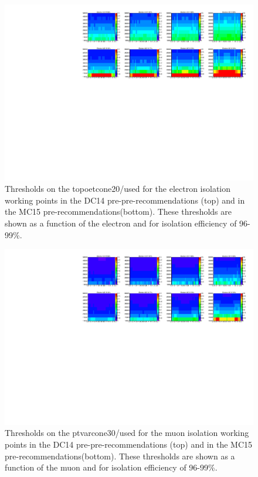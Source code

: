 \begin{figure}[phtb!]
\begin{center}
\includegraphics[width=\textwidth]{FIGURES/ISOLATION/Electron_topoetcone20.pdf}
\end{center}
\vspace{-0.2cm}
\caption{Thresholds on the topoetcone20/\pt used for the electron isolation working points in the DC14 pre-pre-recommendations (top) and in the MC15 pre-recommendations(bottom). These thresholds are shown as a function of the electron \pt and \eta for isolation efficiency of 96-99\%.}
\label{fig:isoThresholdsEleCalo}
\end{figure}



\begin{figure}[phtb!]
\begin{center}
\includegraphics[width=\textwidth]{FIGURES/ISOLATION/Electron_ptvarcone20.pdf}
\end{center}
\vspace{-0.2cm}
\caption{Thresholds on the ptvarcone30/\pt used for the muon isolation working points in the DC14 pre-pre-recommendations (top) and in the MC15 pre-recommendations(bottom). These thresholds are shown as a function of the muon \pt and \eta for isolation efficiency of 96-99\%. }
\label{fig:isoThresholdsMuTrk}
\end{figure}



